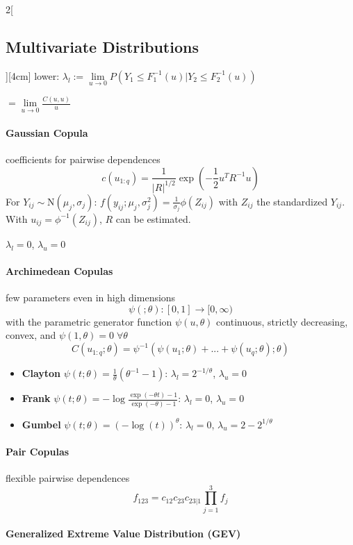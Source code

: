 \documentclass[8pt]{extarticle}
\begin{document}
\begin{multicols}{2}[\subsection{Multivariate Distributions}][4cm]
   lower: $ \lambda_{l}  := \underset{u\rightarrow 0}{\lim} P(Y_1 \leq F_1^{-1}(u)|Y_2\leq F_2^{-1}(u))$   
   
   $ = \underset{u\rightarrow 0}{\lim} \frac{C(u,u)}{u}$
   
   \paragraph{Gaussian Copula} coefficients for pairwise dependences 
   $$c(u_{1:q}) = \frac{1}{|R|^{1/2}} \exp\left(-\frac{1}{2}u^TR^{-1}u\right)$$  
   For $Y_{ij} \sim \mathrm{N}(\mu_j,\sigma_j)$: $f(y_{ij};\mu_j, \sigma^2_j) = \frac{1}{\sigma_j}\phi(Z_{ij})$ with $Z_{ij}$ the standardized $Y_{ij}$. With $u_{ij} = \phi^{-1}(Z_{ij})$, $R$ can be estimated.
   
   $\lambda_l = 0$, $\lambda_u = 0$
   
   \paragraph{Archimedean Copulas} few parameters even in high dimensions
   $$\psi(;\theta):[0,1] \rightarrow [0,\infty)$$
with the parametric generator function $\psi(u,\theta)$ continuous, strictly decreasing, convex, and $\psi(1,\theta) = 0\; \forall \theta$
 $$C(u_{1:q};\theta) = \psi^{-1}(\psi(u_1;\theta)+...+ \psi(u_q;\theta);\theta)$$
 
 \begin{itemize}
 \item \textbf{Clayton} $\psi(t;\theta) = \frac{1}{\theta}(\theta^{-1}-1)$: $\lambda_l = 2^{-1/\theta}$, $\lambda_u = 0$
 \item \textbf{Frank}  $\psi(t;\theta) = -\log \frac{\exp(-\theta t)-1}{\exp(-\theta )-1}$: $\lambda_l = 0$, $\lambda_u = 0$
  \item \textbf{Gumbel} $\psi(t;\theta) = (-\log(t))^\theta$: $\lambda_l = 0$, $\lambda_u = 2-2^{1/\theta}$
 \end{itemize}
 
 \paragraph{Pair Copulas} flexible pairwise dependences
 $$f_{123} = c_{12}c_{23}c_{23|1} \prod_{j=1}^3 f_j$$
 
 \paragraph{Generalized Extreme Value Distribution (GEV)} \ \\
 

\end{multicols}
\end{document}
